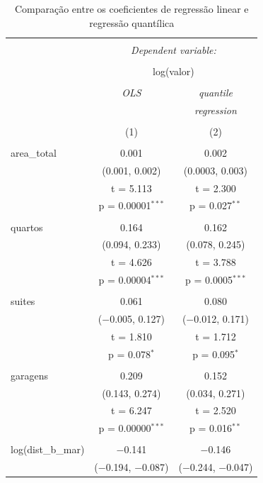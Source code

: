 \documentclass[a4paper]{article}
\begin{document}
\begin{table}[!htbp] \centering 
  \caption{Comparação entre os coeficientes de regressão linear e regressão quantílica} 
  \label{tab:fit} 
\begin{tabular}{@{\extracolsep{5pt}}lcc} 
\\[-1.8ex]\hline 
\hline \\[-1.8ex] 
 & \multicolumn{2}{c}{\textit{Dependent variable:}} \\ 
\cline{2-3} 
\\[-1.8ex] & \multicolumn{2}{c}{log(valor)} \\ 
\\[-1.8ex] & \textit{OLS} & \textit{quantile} \\ 
 & \textit{} & \textit{regression} \\ 
\\[-1.8ex] & (1) & (2)\\ 
\hline \\[-1.8ex] 
 area\_total & 0.001 & 0.002 \\ 
  & (0.001, 0.002) & (0.0003, 0.003) \\ 
  & t = 5.113 & t = 2.300 \\ 
  & p = 0.00001$^{***}$ & p = 0.027$^{**}$ \\ 
  & & \\ 
 quartos & 0.164 & 0.162 \\ 
  & (0.094, 0.233) & (0.078, 0.245) \\ 
  & t = 4.626 & t = 3.788 \\ 
  & p = 0.00004$^{***}$ & p = 0.0005$^{***}$ \\ 
  & & \\ 
 suites & 0.061 & 0.080 \\ 
  & ($-$0.005, 0.127) & ($-$0.012, 0.171) \\ 
  & t = 1.810 & t = 1.712 \\ 
  & p = 0.078$^{*}$ & p = 0.095$^{*}$ \\ 
  & & \\ 
 garagens & 0.209 & 0.152 \\ 
  & (0.143, 0.274) & (0.034, 0.271) \\ 
  & t = 6.247 & t = 2.520 \\ 
  & p = 0.00000$^{***}$ & p = 0.016$^{**}$ \\ 
  & & \\ 
 log(dist\_b\_mar) & $-$0.141 & $-$0.146 \\ 
  & ($-$0.194, $-$0.087) & ($-$0.244, $-$0.047) \\ 

\end{tabular}
\end{table}
\end{document}
